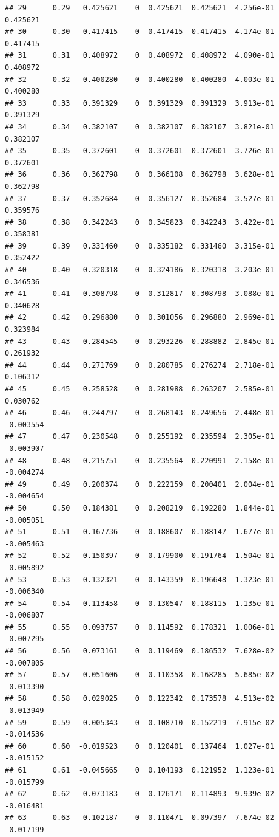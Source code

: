 \documentclass{article}\usepackage[]{graphicx}\usepackage[]{color}
\makeatletter
\newenvironment{kframe}{%
 \def\at@end@of@kframe{}%
 \ifinner\ifhmode%
  \def\at@end@of@kframe{\end{minipage}}%
  \begin{minipage}{\columnwidth}%
 \fi\fi%
 \def\FrameCommand##1{\hskip\@totalleftmargin \hskip-\fboxsep
 \colorbox{shadecolor}{##1}\hskip-\fboxsep
     \hskip-\linewidth \hskip-\@totalleftmargin \hskip\columnwidth}%
 \MakeFramed {\advance\hsize-\width
   \@totalleftmargin\z@ \linewidth\hsize
   \@setminipage}}%
 {\par\unskip\endMakeFramed%
 \at@end@of@kframe}
\newenvironment{knitrout}{}{} %
\makeatother
\begin{document}
\begin{knitrout}
\begin{kframe}
\begin{verbatim}
## 29      0.29   0.425621    0  0.425621  0.425621  4.256e-01    0.425621
## 30      0.30   0.417415    0  0.417415  0.417415  4.174e-01    0.417415
## 31      0.31   0.408972    0  0.408972  0.408972  4.090e-01    0.408972
## 32      0.32   0.400280    0  0.400280  0.400280  4.003e-01    0.400280
## 33      0.33   0.391329    0  0.391329  0.391329  3.913e-01    0.391329
## 34      0.34   0.382107    0  0.382107  0.382107  3.821e-01    0.382107
## 35      0.35   0.372601    0  0.372601  0.372601  3.726e-01    0.372601
## 36      0.36   0.362798    0  0.366108  0.362798  3.628e-01    0.362798
## 37      0.37   0.352684    0  0.356127  0.352684  3.527e-01    0.359576
## 38      0.38   0.342243    0  0.345823  0.342243  3.422e-01    0.358381
## 39      0.39   0.331460    0  0.335182  0.331460  3.315e-01    0.352422
## 40      0.40   0.320318    0  0.324186  0.320318  3.203e-01    0.346536
## 41      0.41   0.308798    0  0.312817  0.308798  3.088e-01    0.340628
## 42      0.42   0.296880    0  0.301056  0.296880  2.969e-01    0.323984
## 43      0.43   0.284545    0  0.293226  0.288882  2.845e-01    0.261932
## 44      0.44   0.271769    0  0.280785  0.276274  2.718e-01    0.106312
## 45      0.45   0.258528    0  0.281988  0.263207  2.585e-01    0.030762
## 46      0.46   0.244797    0  0.268143  0.249656  2.448e-01   -0.003554
## 47      0.47   0.230548    0  0.255192  0.235594  2.305e-01   -0.003907
## 48      0.48   0.215751    0  0.235564  0.220991  2.158e-01   -0.004274
## 49      0.49   0.200374    0  0.222159  0.200401  2.004e-01   -0.004654
## 50      0.50   0.184381    0  0.208219  0.192280  1.844e-01   -0.005051
## 51      0.51   0.167736    0  0.188607  0.188147  1.677e-01   -0.005463
## 52      0.52   0.150397    0  0.179900  0.191764  1.504e-01   -0.005892
## 53      0.53   0.132321    0  0.143359  0.196648  1.323e-01   -0.006340
## 54      0.54   0.113458    0  0.130547  0.188115  1.135e-01   -0.006807
## 55      0.55   0.093757    0  0.114592  0.178321  1.006e-01   -0.007295
## 56      0.56   0.073161    0  0.119469  0.186532  7.628e-02   -0.007805
## 57      0.57   0.051606    0  0.110358  0.168285  5.685e-02   -0.013390
## 58      0.58   0.029025    0  0.122342  0.173578  4.513e-02   -0.013949
## 59      0.59   0.005343    0  0.108710  0.152219  7.915e-02   -0.014536
## 60      0.60  -0.019523    0  0.120401  0.137464  1.027e-01   -0.015152
## 61      0.61  -0.045665    0  0.104193  0.121952  1.123e-01   -0.015799
## 62      0.62  -0.073183    0  0.126171  0.114893  9.939e-02   -0.016481
## 63      0.63  -0.102187    0  0.110471  0.097397  7.674e-02   -0.017199

\end{verbatim}
\end{kframe}
\end{knitrout}
\end{document}

